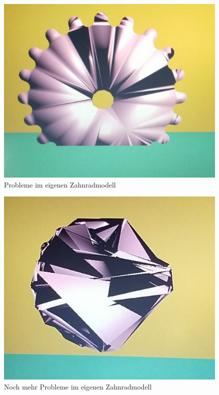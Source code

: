 \documentclass{article}
\begin{document}
\begin{figure}[h!]
\centering
\includegraphics[scale=1.0]{Buggy_Gear1.png}
\caption{Probleme im eigenen Zahnradmodell}
\label{fig:bugGear1}
\end{figure}

\begin{figure}[h!]
\centering
\includegraphics[scale=1.0]{Buggy_Gear2.png}
\caption{Noch mehr Probleme im eigenen Zahnradmodell}
\label{fig:bugGear2}
\end{figure}
\end{document}
